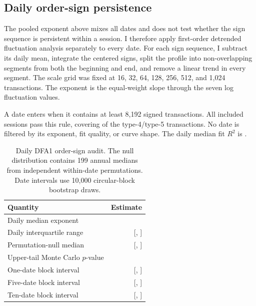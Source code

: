 \documentclass[11pt,a4paper]{article}
\newcommand{\Rtwo}{\ensuremath{R^2}}
\begin{document}
\subsection{Daily order-sign persistence}

The pooled exponent above mixes all dates and does not test whether the sign
sequence is persistent within a session. I therefore apply first-order
detrended fluctuation analysis \citep{peng1994} separately to every date. For
each sign sequence, I subtract its daily mean, integrate the centered signs,
split the profile into non-overlapping segments from both the beginning and
end, and remove a linear trend in every segment. The scale grid was fixed at
16, 32, 64, 128, 256, 512, and 1,024 transactions. The exponent is the
equal-weight slope through the seven log fluctuation values.

A date enters when it contains at least 8,192 signed transactions. All
\DfaIncludedDates{} included sessions pass this rule, covering
\DfaCoveredShare{} of the \ScalingTransactions{} type-4/type-5 transactions.
No date is filtered by its exponent, fit quality, or curve shape. The daily
median fit \Rtwo{} is \DfaMedianFitRtwo{}.

\begin{table}[H]
  \centering
  \caption{Daily DFA1 order-sign audit. The null distribution contains 199
  annual medians from independent within-date permutations. Date intervals
  use 10,000 circular-block bootstrap draws.}
  \label{tab:dfa}
  \begin{tabular}{lr}
    \toprule
    Quantity & Estimate \\
    \midrule
    Daily median exponent & \DfaMedianExponent{} \\
    Daily interquartile range &
      [\DfaQoneExponent{}, \DfaQthreeExponent{}] \\
    Permutation-null median &
      \DfaNullMedianExponent{} [\DfaNullLower{}, \DfaNullUpper{}] \\
    Upper-tail Monte Carlo \(p\)-value & \DfaPermutationP{} \\
    One-date block interval &
      [\DfaOneBlockLower{}, \DfaOneBlockUpper{}] \\
    Five-date block interval &
      [\DfaFiveBlockLower{}, \DfaFiveBlockUpper{}] \\
    Ten-date block interval &
      [\DfaTenBlockLower{}, \DfaTenBlockUpper{}] \\
    \bottomrule
  \end{tabular}
\end{table}
\end{document}
